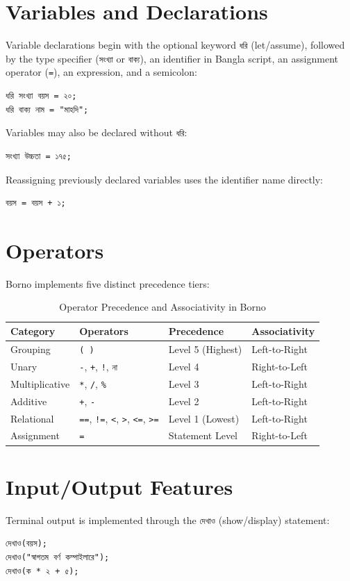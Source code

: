 \documentclass[12pt, a4paper]{report}
\begin{document}
\section{Variables and Declarations}
Variable declarations begin with the optional keyword \texttt{ধরি} (let/assume), followed by the type specifier (\texttt{সংখ্যা} or \texttt{বাক্য}), an identifier in Bangla script, an assignment operator (\texttt{=}), an expression, and a semicolon:
\begin{lstlisting}
ধরি সংখ্যা বয়স = ২০;
ধরি বাক্য নাম = "মাহদি";
\end{lstlisting}
Variables may also be declared without \texttt{ধরি}:
\begin{lstlisting}
সংখ্যা উচ্চতা = ১৭৫;
\end{lstlisting}
Reassigning previously declared variables uses the identifier name directly:
\begin{lstlisting}
বয়স = বয়স + ১;
\end{lstlisting}

\section{Operators}
Borno implements five distinct precedence tiers:
\begin{table}[htbp]
\centering
\small
\renewcommand{\arraystretch}{1.25}
\begin{tabular}{|l|l|l|l|}
\hline
\textbf{Category} & \textbf{Operators} & \textbf{Precedence} & \textbf{Associativity} \\
\hline
Grouping & \texttt{( )} & Level 5 (Highest) & Left-to-Right \\
\hline
Unary & \texttt{-}, \texttt{+}, \texttt{!}, \texttt{না} & Level 4 & Right-to-Left \\
\hline
Multiplicative & \texttt{*}, \texttt{/}, \texttt{\%} & Level 3 & Left-to-Right \\
\hline
Additive & \texttt{+}, \texttt{-} & Level 2 & Left-to-Right \\
\hline
Relational & \texttt{==}, \texttt{!=}, \texttt{<}, \texttt{>}, \texttt{<=}, \texttt{>=} & Level 1 (Lowest) & Left-to-Right \\
\hline
Assignment & \texttt{=} & Statement Level & Right-to-Left \\
\hline
\end{tabular}
\caption{Operator Precedence and Associativity in Borno}
\label{tab:operators}
\end{table}

\section{Input/Output Features}
Terminal output is implemented through the \texttt{দেখাও} (show/display) statement:
\begin{lstlisting}
দেখাও(বয়স);
দেখাও("স্বাগতম বর্ণ কম্পাইলারে");
দেখাও(ক * ২ + ৫);
\end{lstlisting}
\end{document}
